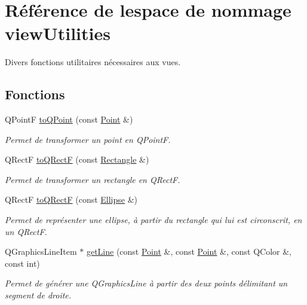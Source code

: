 \hypertarget{namespaceviewUtilities}{}\section{Référence de l\textquotesingle{}espace de nommage view\+Utilities}
\label{namespaceviewUtilities}


Divers fonctions utilitaires nécessaires aux vues.  


\subsection*{Fonctions}
\begin{DoxyCompactItemize}
\item 
Q\+Point\+F \hyperlink{namespaceviewUtilities_a2a190881156bffa91f8c191871fb607e}{to\+Q\+Point} (const \hyperlink{classPoint}{Point} \&)
\begin{DoxyCompactList}\small\item\em Permet de transformer un point en Q\+Point\+F. \end{DoxyCompactList}\item 
Q\+Rect\+F \hyperlink{namespaceviewUtilities_a9024a09c86906c1795499b327df85e4a}{to\+Q\+Rect\+F} (const \hyperlink{classRectangle}{Rectangle} \&)
\begin{DoxyCompactList}\small\item\em Permet de transformer un rectangle en Q\+Rect\+F. \end{DoxyCompactList}\item 
Q\+Rect\+F \hyperlink{namespaceviewUtilities_a5b6587cfeb6f69361f0b063e0060043c}{to\+Q\+Rect\+F} (const \hyperlink{classEllipse}{Ellipse} \&)
\begin{DoxyCompactList}\small\item\em Permet de représenter une ellipse, à partir du rectangle qui lui est circonscrit, en un Q\+Rect\+F. \end{DoxyCompactList}\item 
Q\+Graphics\+Line\+Item $\ast$ \hyperlink{namespaceviewUtilities_a339d6b317f890dd0a8c55c57c0a3db8b}{get\+Line} (const \hyperlink{classPoint}{Point} \&, const \hyperlink{classPoint}{Point} \&, const Q\+Color \&, const int)
\begin{DoxyCompactList}\small\item\em Permet de générer une Q\+Graphics\+Line à partir des deux points délimitant un segment de droite. \end{DoxyCompactList}\item 

\end{DoxyCompactItemize}
